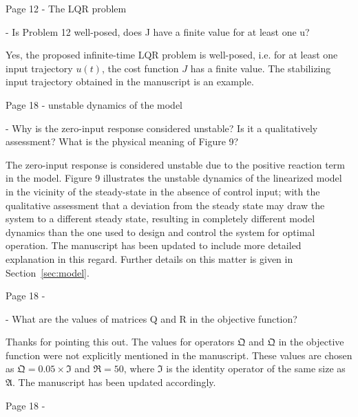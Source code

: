 \documentclass[12pt,answers]{exam}
\begin{document}
\begin{questions}
    \question Page 12 - The LQR problem

    - Is Problem 12 well-posed, does J have a finite value for at least one u?

    \begin{solutionorbox}
        Yes, the proposed infinite-time LQR problem is well-posed, i.e. for at least one input trajectory $u(t)$, the cost function $J$ has a finite value. The stabilizing input trajectory obtained in the manuscript is an example. %
    \end{solutionorbox}


    \question Page 18 - unstable dynamics of the model

    - Why is the zero-input response considered unstable? Is it a qualitatively assessment? What is the physical meaning of Figure 9?

    \begin{solutionorbox}
        The zero-input response is considered unstable due to the positive reaction term in the model. Figure 9 illustrates the unstable dynamics of the linearized model in the vicinity of the steady-state in the absence of control input; with the qualitative assessment that a deviation from the steady state may draw the system to a different steady state, resulting in completely different model dynamics than the one used to design and control the system for optimal operation. The manuscript has been updated to include more detailed explanation in this regard. Further details on this matter is given in Section~\ref{sec:model}.

    \end{solutionorbox}


    \question Page 18 - 

    - What are the values of matrices Q and R in the objective function?

    \begin{solutionorbox}
        Thanks for pointing this out. The values for operators $\mathfrak{Q}$ and $\mathfrak{Q}$ in the objective function were not explicitly mentioned in the manuscript. These values are chosen as $\mathfrak{Q} = 0.05 \times \mathfrak{I}$ and $\mathfrak{R} = 50$, where $\mathfrak{I}$ is the identity operator of the same size as $\mathfrak{A}$. The manuscript has been updated accordingly.
    \end{solutionorbox}


    \question Page 18 - 


\end{questions}
\end{document}
